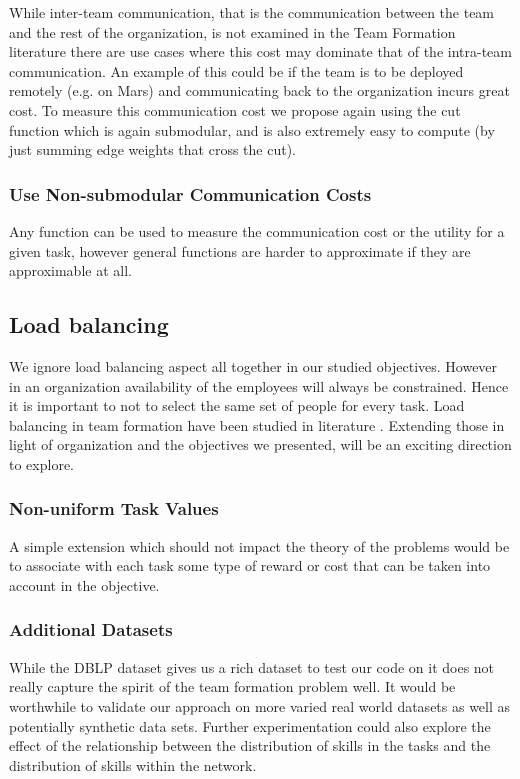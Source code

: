 While inter-team communication, that is the communication between the team and the rest of the organization, is not examined in the Team Formation literature there are use cases where this cost may dominate that of the intra-team communication. An example of this could be if the team is to be deployed remotely (e.g. on Mars) and communicating back to the organization incurs great cost. To measure this communication cost we propose again using the cut function which is again submodular, and is also extremely easy to compute (by just summing edge weights that cross the cut).

\subsubsection{Use Non-submodular Communication Costs}

Any function can be used to measure the communication cost or the utility for a given task, however general functions are harder to approximate if they are approximable at all. 

\subsection{Load balancing}

We ignore load balancing aspect all together in our studied objectives. However in an organization availability of the employees will always be constrained. Hence it is important to not to select the same set of people for every task. Load balancing in team formation have been studied in literature \cite{wang2016ustf,liu2017simple}. Extending those in light of organization and the objectives we presented, will be an exciting direction to explore. 

\subsubsection{Non-uniform Task Values}

A simple extension which should not impact the theory of the problems would be to associate with each task some type of reward or cost that can be taken into account in the objective. 

\subsubsection{Additional Datasets}

While the DBLP dataset gives us a rich dataset to test our code on it does not really capture the spirit of the team formation problem well. It would be worthwhile to validate our approach on more varied real world datasets as well as potentially synthetic data sets. Further experimentation could also explore the effect of the relationship between the distribution of skills in the tasks and the distribution of skills within the network. 

